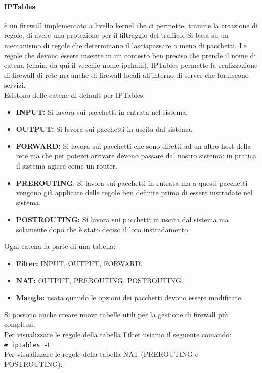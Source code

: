 \documentclass[a4paper]{report}
\newcommand\tab[1][1cm]{\hspace*{#1}}
\begin{document}
\paragraph{IPTables} è un firewall implementato a livello kernel che ci permette, tramite la creazione di regole, di avere una protezione per il filtraggio del traffico. Si basa su un meccanismo di regole che determinano il lasciapassare o meno di pacchetti. Le regole che devono essere inserite in un contesto ben preciso che prende il nome di catena (chain, da qui il vecchio nome ipchain). IPTables permette la realizzazione di firewall di rete ma anche di firewall locali all'interno di server che forniscono servizi.\\
Esistono delle catene di default per IPTables:
\begin{itemize}
\item \textbf{INPUT:} Si lavora sui pacchetti in entrata nel sistema.
\item \textbf{OUTPUT:} Si lavora sui pacchetti in uscita dal sistema.
\item \textbf{FORWARD:} Si lavora sui pacchetti che sono diretti ad un altro host
della rete ma che per poterci arrivare devono passare dal nostro
sistema: in pratica il sistema agisce come un router.
\item \textbf{PREROUTING}: Si lavora sui pacchetti in entrata ma a questi
pacchetti vengono già applicate delle regole ben definite prima di
essere instradate nel sistema.
\item \textbf{POSTROUTING:} Si lavora sui pacchetti in uscita dal sistema ma
solamente dopo che è stato deciso il loro instradamento.
\end{itemize}
Ogni catena fa parte di una tabella:
\begin{itemize}
\item \textbf{Filter:} INPUT, OUTPUT, FORWARD.
\item \textbf{NAT:} OUTPUT, PREROUTING, POSTROUTING.
\item \textbf{Mangle:} usata quando le opzioni dei pacchetti devono essere modificate.
\end{itemize}
Si possono anche creare nuove tabelle utili per la gestione di firewall più complessi.\\
Per visualizzare le regole della tabella Filter usiamo il seguente comando:\\
\tab\texttt{\# iptables -L}\\
Per visualizzare le regole della tabella NAT (PREROUTING e POSTROUTING):\\
\end{document}
